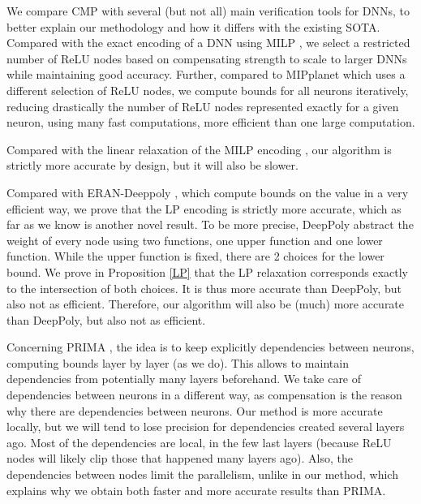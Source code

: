 We compare CMP with several (but not all) main verification tools for DNNs, to better explain our methodology and how it differs with the existing SOTA. Compared with the exact encoding of a DNN using MILP \cite{MILP}, 
we select a restricted number of ReLU nodes based on compensating strength to scale to larger DNNs while maintaining good accuracy. Further, compared to MIPplanet \cite{MIPplanet} which 
uses a different selection of ReLU nodes, we compute bounds for all neurons iteratively, reducing drastically the number of ReLU nodes represented exactly for a given neuron,
using many fast computations, more efficient than one large computation.

Compared with the linear relaxation of the MILP encoding \cite{MILP}, our algorithm is strictly more accurate by design, but it will also be slower.

Compared with ERAN-Deeppoly \cite{deeppoly}, which compute bounds on the value in a very efficient way, we prove that the LP encoding is strictly more accurate, which as far as we know is another novel result. To be more precise, DeepPoly
abstract the weight of every node using two functions, one upper function and one lower function. While the upper function is fixed, there are 2 choices for the lower bound.
We prove in Proposition  \ref{LP} that the LP relaxation corresponds exactly to the intersection of both choices. It is thus more accurate than DeepPoly, but also not as efficient. Therefore, our algorithm will also be (much) more accurate than DeepPoly, but also not as efficient.

Concerning PRIMA \cite{prima}, the idea is to keep explicitly dependencies between neurons, computing bounds layer by layer (as we do). This allows to maintain dependencies from potentially many layers beforehand. We take care of dependencies between neurons in a different way, as compensation is the reason why there are dependencies between neurons. 
Our method is more accurate locally, but we will tend to lose precision for dependencies created several layers ago. Most of the dependencies are local, in the few last layers (because ReLU nodes will likely clip those that happened many layers ago). Also, the dependencies between nodes limit the parallelism, unlike in our method, which explains why we obtain both faster and more accurate results than PRIMA.

